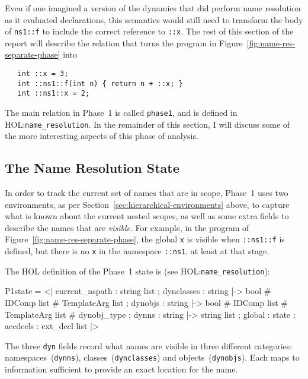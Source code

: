 \documentclass[11pt]{article}
\newcommand{\HOLfile}[1]{HOL:\texttt{#1}}
\begin{document}
Even if one imagined a version of the dynamics that did perform name
resolution as it evaluated declarations, this semantics would still
need to transform the body of \texttt{ns1::f} to include the correct
reference to \texttt{::x}.  The rest of this section of the report
will describe the relation that turns the program in
Figure~\ref{fig:name-res-separate-phase} into
\begin{verbatim}
   int ::x = 3;
   int ::ns1::f(int n) { return n + ::x; }
   int ::ns1::x = 2;
\end{verbatim}

\bigskip\noindent The main relation in Phase~1 is called
\texttt{phase1}, and is defined in \HOLfile{name_resolution}.  In the
remainder of this section, I will discuss some of the more interesting
aspects of this phase of analysis.

\subsection{The Name Resolution State}
\label{sec:name-resol-state}

In order to track the current set of names that are in scope, Phase~1
uses two environments, as per
Section~\ref{sec:hierarchical-environments} above, to capture what is
known about the current nested scopes, as well as some extra fields to
describe the names that are \emph{visible}.  For example, in the
program of Figure~\ref{fig:name-res-separate-phase}, the global
\texttt{x} is visible when \texttt{::ns1::f} is defined, but there is
no \texttt{x} in the namespace \texttt{::ns1}, at least at that stage.

The HOL definition of the Phase~1 state is (see
\HOLfile{name_resolution}):
\begin{stdrule}
   P1state = <|
     current_nspath : string list ;
     dynclasses : string |-> bool # IDComp list #
                             TemplateArg list ;
     dynobjs : string |-> bool # IDComp list #
                          TemplateArg list # dynobj_type ;
     dynns : string |-> string list ;
     global : state ;
     accdecls : ext_decl list
   |>
\end{stdrule}
The three \texttt{dyn} fields record what names are visible in three
different categories: namespaces~(\texttt{dynns}),
classes~(\texttt{dynclasses}) and objects~(\texttt{dynobjs}).  Each
maps to information sufficient to provide an exact location for the
name.
\end{document}
